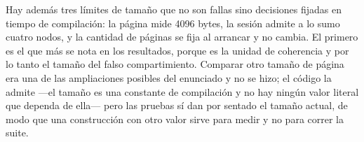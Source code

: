 Hay además tres límites de tamaño que no son fallas sino decisiones fijadas en
tiempo de compilación: la página mide 4096 bytes, la sesión admite a lo sumo
cuatro nodos, y la cantidad de páginas se fija al arrancar y no cambia. El
primero es el que más se nota en los resultados, porque es la unidad de
coherencia y por lo tanto el tamaño del falso compartimiento. Comparar otro
tamaño de página era una de las ampliaciones posibles del enunciado y no se
hizo; el código la admite —el tamaño es una constante de compilación y no hay
ningún valor literal que dependa de ella— pero las pruebas sí dan por sentado
el tamaño actual, de modo que una construcción con otro valor sirve para medir
y no para correr la suite.

